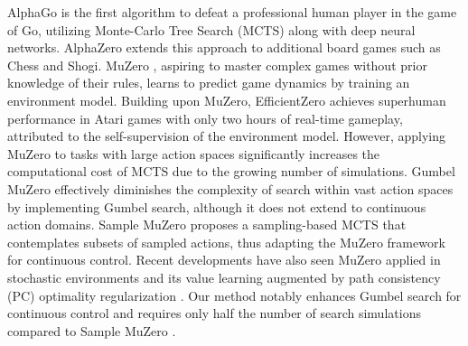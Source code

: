 AlphaGo \citep{silver2016mastering} is the first algorithm to defeat a professional human player in the game of Go, utilizing Monte-Carlo Tree Search (MCTS) \citep{coulom2006efficient} along with deep neural networks. 
AlphaZero \citep{silver2017masteringchess} extends this approach to additional board games such as Chess and Shogi. 
MuZero \citep{schrittwieser2020mastering}, aspiring to master complex games without prior knowledge of their rules, learns to predict game dynamics by training an environment model.
Building upon MuZero, EfficientZero \cite{ye2021mastering} achieves superhuman performance in Atari games with only two hours of real-time gameplay, attributed to the self-supervision of the environment model. 
However, applying MuZero to tasks with large action spaces significantly increases the computational cost of MCTS due to the growing number of simulations. Gumbel MuZero \citep{danihelka2021policy} effectively diminishes the complexity of search within vast action spaces by implementing Gumbel search, although it does not extend to continuous action domains. Sample MuZero \cite{hubert2021learning} proposes a sampling-based MCTS that contemplates subsets of sampled actions, thus adapting the MuZero framework for continuous control. Recent developments have also seen MuZero applied in stochastic environments \citep{antonoglou2021planning} and its value learning augmented by path consistency (PC) optimality regularization \citep{zhao2022efficient}. 
Our method notably enhances Gumbel search for continuous control and requires only half the number of search simulations compared to Sample MuZero \citep{hubert2021learning}.

